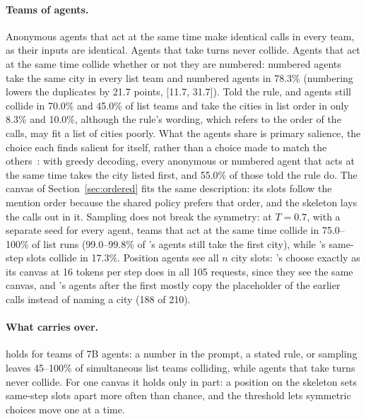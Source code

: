 \paragraph{Teams of agents.} Anonymous agents that act at the same time make identical calls in every team, as their inputs are identical. Agents that take turns never collide. Agents that act at the same time collide whether or not they are numbered: numbered \qwen agents take the same city in every list team and numbered \dream agents in 78.3\% (numbering lowers the duplicates by 21.7 points, [11.7, 31.7]). Told the rule, \qwen and \dream agents still collide in 70.0\% and 45.0\% of list teams and take the cities in list order in only 8.3\% and 10.0\%, although the rule's wording, which refers to the order of the calls, may fit a list of cities poorly. What the agents share is primary salience, the choice each finds salient for itself, rather than a choice made to match the others~\cite{mehta1994salience,bardsley2010explaining}: with greedy decoding, every anonymous or numbered \qwen agent that acts at the same time takes the city listed first, and 55.0\% of those told the rule do. The canvas of Section~\ref{sec:ordered} fits the same description: its slots follow the mention order because the shared policy prefers that order, and the skeleton lays the calls out in it. Sampling does not break the symmetry: at $T=0.7$, with a separate seed for every agent, teams that act at the same time collide in 75.0--100\% of list runs (99.0--99.8\% of \qwen's agents still take the first city), while \dream's same-step slots collide in 17.3\%. Position agents see all $n$ city slots: \dream's choose exactly as its canvas at 16 tokens per step does in all 105 requests, since they see the same canvas, and \qwen's agents after the first mostly copy the placeholder of the earlier calls instead of naming a city (188 of 210).

\paragraph{What carries over.}  holds for teams of 7B agents: a number in the prompt, a stated rule, or sampling leaves 45--100\% of simultaneous list teams colliding, while agents that take turns never collide. For one canvas it holds only in part: a position on the skeleton sets same-step slots apart more often than chance, and the threshold lets symmetric choices move one at a time.
